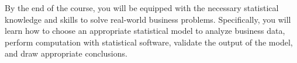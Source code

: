 \documentclass[11pt]{article}
\begin{document}
By the end of the course, you will be equipped with the necessary statistical  knowledge and skills to solve real-world business problems. Specifically,  you will learn how to choose an appropriate statistical model to analyze business data, perform computation with statistical software, validate the output of the model, and draw appropriate conclusions. 
%
%
%
%
%
%
%
%
%
%
%
\end{document}
